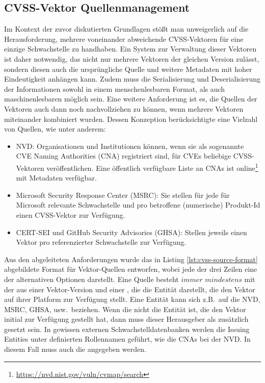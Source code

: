 \subsection{CVSS-Vektor Quellenmanagement} \label{subsec:projektbericht-loesungsweg-cvss-source-management}

Im Kontext der zuvor diskutierten Grundlagen stößt man unweigerlich auf die Herausforderung, mehrere voneinander abweichende CVSS-Vektoren für eine einzige Schwachstelle zu handhaben.
Ein System zur Verwaltung dieser Vektoren ist daher notwendig, das nicht nur mehrere Vektoren der gleichen Version zulässt, sondern diesen auch die ursprüngliche Quelle und weitere Metadaten mit hoher Eindeutigkeit anhängen kann.
Zudem muss die Serialisierung und Deserialisierung der Informationen sowohl in einem menschenlesbaren Format, als auch maschinenlesbaren möglich sein.
Eine weitere Anforderung ist es, die Quellen der Vektoren auch dann noch nachvollziehen zu können, wenn mehrere Vektoren miteinander kombiniert wurden.
Dessen Konzeption berücksichtigte eine Vielzahl von Quellen, wie unter anderem:

\begin{itemize}
    \item NVD:
    Organisationen und Institutionen können, wenn sie als sogenannte CVE Naming Authorities (CNA) registriert sind, für CVEs beliebige CVSS-Vektoren veröffentlichen.
    Eine öffentlich verfügbare Liste an CNAs ist online\footnote{\url{https://nvd.nist.gov/vuln/cvmap/search}} mit Metadaten verfügbar.
    \item Microsoft Security Response Center (MSRC):
    Sie stellen für jede für Microsoft relevante Schwachstelle und pro betroffene (numerische) Produkt-Id einen CVSS-Vektor zur Verfügung.
    \item CERT-SEI und GitHub Security Advisories (GHSA): Stellen jeweils einen Vektor pro referenzierter Schwachstelle zur Verfügung.
\end{itemize}

Aus den abgeleiteten Anforderungen wurde das in Listing \ref{lst:cvss-source-format} abgebildete Format für Vektor-Quellen entworfen, wobei jede der drei Zeilen eine der alternativen Optionen darstellt.
Eine Quelle besteht $immer$ $mindestens$ mit der  aus einer Vektor-Version und einer , die die Entität darstellt, die den Vektor auf ihrer Platform zur Verfügung stellt.
Eine Entität kann sich z.B.\ auf die NVD, MSRC, GHSA, usw.\ beziehen.
Wenn die  nicht die Entität ist, die den Vektor initial zur Verfügung gestellt hat, dann muss dieser Herausgeber als  zusätzlich gesetzt sein.
In gewissen externen Schwachstelldatenbanken werden die Issuing Entities unter definierten Rollennamen geführt, wie die CNAs bei der NVD\@.
In diesem Fall muss auch die  angegeben werden.

